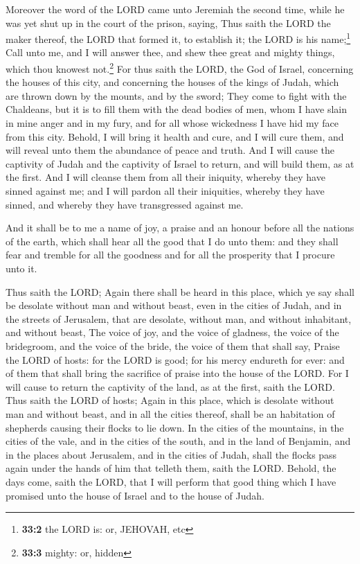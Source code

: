  Moreover the word of the LORD came unto Jeremiah the
second time, while he was yet shut up in the court of the prison,
saying,  Thus saith the LORD the maker thereof, the LORD
that formed it, to establish it; the LORD is his name;\footnote{\textbf{33:2}
  the LORD is: or, JEHOVAH, etc}  Call unto me, and I will
answer thee, and shew thee great and mighty things, which thou knowest
not.\footnote{\textbf{33:3} mighty: or, hidden}  For thus
saith the LORD, the God of Israel, concerning the houses of this city,
and concerning the houses of the kings of Judah, which are thrown down
by the mounts, and by the sword;  They come to fight with
the Chaldeans, but it is to fill them with the dead bodies of men, whom
I have slain in mine anger and in my fury, and for all whose wickedness
I have hid my face from this city.  Behold, I will bring
it health and cure, and I will cure them, and will reveal unto them the
abundance of peace and truth.  And I will cause the
captivity of Judah and the captivity of Israel to return, and will build
them, as at the first.  And I will cleanse them from all
their iniquity, whereby they have sinned against me; and I will pardon
all their iniquities, whereby they have sinned, and whereby they have
transgressed against me.

 And it shall be to me a name of joy, a praise and an
honour before all the nations of the earth, which shall hear all the
good that I do unto them: and they shall fear and tremble for all the
goodness and for all the prosperity that I procure unto it.

 Thus saith the LORD; Again there shall be heard in this
place, which ye say shall be desolate without man and without beast,
even in the cities of Judah, and in the streets of Jerusalem, that are
desolate, without man, and without inhabitant, and without beast,
 The voice of joy, and the voice of gladness, the voice
of the bridegroom, and the voice of the bride, the voice of them that
shall say, Praise the LORD of hosts: for the LORD is good; for his mercy
endureth for ever: and of them that shall bring the sacrifice of praise
into the house of the LORD. For I will cause to return the captivity of
the land, as at the first, saith the LORD.  Thus saith
the LORD of hosts; Again in this place, which is desolate without man
and without beast, and in all the cities thereof, shall be an habitation
of shepherds causing their flocks to lie down.  In the
cities of the mountains, in the cities of the vale, and in the cities of
the south, and in the land of Benjamin, and in the places about
Jerusalem, and in the cities of Judah, shall the flocks pass again under
the hands of him that telleth them, saith the LORD. 
Behold, the days come, saith the LORD, that I will perform that good
thing which I have promised unto the house of Israel and to the house of
Judah.

